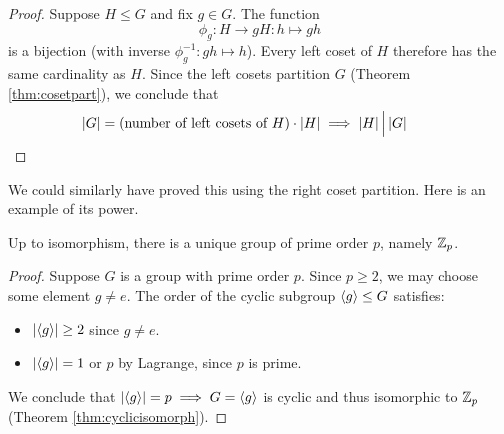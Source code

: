 

\begin{proof}
Suppose $H\le G$ and fix $g\in G$. The function
\[\phi_g:H\to gH:h\mapsto gh\]
is a bijection (with inverse $\phi_g^{-1}:gh\mapsto h$). Every left coset of $H$ therefore has the same cardinality as $H$. Since the left cosets partition $G$ (Theorem \ref{thm:cosetpart}), we conclude that
\[\left| G\right|=\text{(number of left cosets of $H$)}\cdot \left| H\right| \implies \left| H\right|\Big\vert \left| G\right|\tag*{\qedhere}\]
\end{proof}


We could similarly have proved this using the right coset partition. %
Here is an example of its power.

\begin{cor}{}{}
Up to isomorphism, there is a unique group of prime order $p$, namely $\mathbb{Z}_p$.
\end{cor}

\begin{proof}
Suppose $G$ is a group with prime order $p$. Since $p\ge 2$, we may choose some element $g\neq e$. The order of the cyclic subgroup $\left\langle g\right\rangle\le G$ satisfies:
\begin{itemize}%
  \item $\left| \left\langle g\right\rangle\right|\ge 2$ since $g\neq e$.
  \item $\left| \left\langle g\right\rangle\right|=1$ or $p$ by Lagrange, since $p$ is prime.
\end{itemize}
We conclude that $\left| \left\langle g\right\rangle\right|=p\implies G=\left\langle g\right\rangle$ is cyclic and thus isomorphic to $\mathbb{Z}_p$ (Theorem \ref{thm:cyclicisomorph}).
\end{proof}

